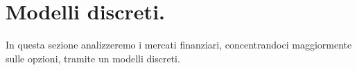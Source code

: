 \section{Modelli discreti.}\label{ModelliDiscreti}
\par In questa sezione analizzeremo i mercati finanziari, concentrandoci maggiormente sulle opzioni, tramite un modelli discreti.


